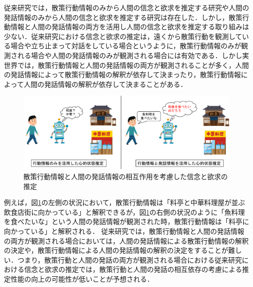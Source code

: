 \par
従来研究では，散策行動情報のみから人間の信念と欲求を推定する研究や人間の発話情報のみから人間の信念と欲求を推定する研究は存在した．しかし，散策行動情報と人間の発話情報の両方を活用し人間の信念と欲求を推定する取り組みは少ない．従来研究における信念と欲求の推定は，遠くから散策行動を観測している場合や立ち止まって対話をしている場合というように，散策行動情報のみが観測される場合や人間の発話情報のみが観測される場合には有効である．しかし実世界では，散策行動情報と人間の発話情報の両方が観測されることが多く，人間の発話情報によって散策行動情報の解釈が依存して決まったり，散策行動情報によって人間の発話情報の解釈が依存して決まることがある．
\begin{figure}[htbp]
  \begin{center}
    \includegraphics[scale=0.5]{./figure1.pdf}
    \caption{散策行動情報と人間の発話情報の相互作用を考慮した信念と欲求の推定}
    \label{fig:fig1}
  \end{center}
\end{figure}
例えば，図\ref{fig:fig1}の左側の状況において，散策行動情報は「料亭と中華料理屋が並ぶ飲食店街に向かっている」と解釈できるが，図\ref{fig:fig1}の右側の状況のように「魚料理を食べたいな」という人間の発話情報が観測された時，散策行動情報は「料亭に向かっている」と解釈される．
従来研究では，散策行動情報と人間の発話情報の両方が観測される場合においては，人間の発話情報による散策行動情報の解釈の決定や，散策行動情報による人間の発話情報の解釈の決定をすることが難しい．つまり，散策行動と人間の発話の両方が観測される場合における従来研究における信念と欲求の推定では，散策行動と人間の発話の相互依存の考慮による推定性能の向上の可能性が低いことが予想される．
